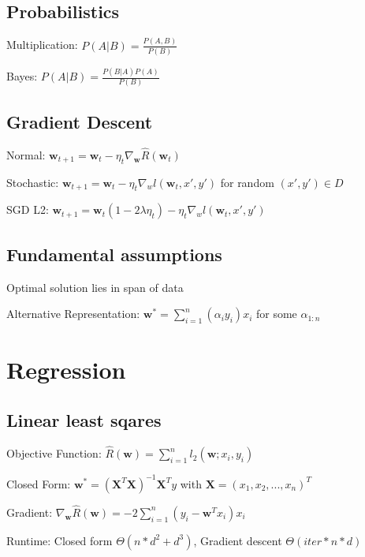 \documentclass[a4paper, 11pt, landscape]{article}
\begin{document}
\begin{multicols*}{3}
\begin{compactdesc}
		\end{compactdesc}
		\subsection{Probabilistics}
		\begin{compactdesc}
			\item[Multiplication:] $P(A|B) = \frac{P(A, B)}{P(B)}$
			\item[Bayes:] $P(A|B) = \frac{P(B|A) P(A)}{P(B)}$
		\end{compactdesc}
		
		
		
		\subsection{Gradient Descent}
		\begin{compactdesc}
			\item[Normal:] $\mathbf{w}_{t+1} = \mathbf{w}_t - \eta_t \nabla_\mathbf{w}\hat{R}(\mathbf{w}_t)$
			\item[Stochastic:] $\mathbf{w}_{t+1} = \mathbf{w}_t - \eta_t \nabla_wl(\mathbf{w}_t, x', y')$ for random $(x', y') \in D$
			\item[SGD L2:] $\mathbf{w}_{t+1} = \mathbf{w}_t(1-2\lambda\eta_t) - \eta_t \nabla_wl(\mathbf{w}_t, x', y')$
		\end{compactdesc}
		
		\subsection{Fundamental assumptions}
		Optimal solution lies in span of data
		\begin{compactdesc}
			\item[Alternative Representation:] $\mathbf{w^*} = \sum_{i=1}^{n}(\alpha_iy_i)x_i$ for some $\alpha_{1:n}$
		\end{compactdesc}

		
		\section{Regression}
		\subsection{Linear least sqares}
		\begin{compactdesc}
			\item[Objective Function:] $\hat{R}(\mathbf{w}) = \sum_{i=1}^{n}l_2(\mathbf{w}; x_i, y_i)$
			\item[Closed Form:] $\mathbf{w^*} = (\mathbf{X}^T\mathbf{X})^{-1}\mathbf{X}^Ty$ with $\mathbf{X} = (x_1, x_2, ..., x_n)^T$
			\item[Gradient:] $\nabla_\mathbf{w} \hat{R}(\mathbf{w}) = -2 \sum_{i=1}^{n}(y_i - \mathbf{w}^Tx_i)x_i$
			\item[Runtime:] Closed form $\varTheta(n*d^2 + d^3)$, Gradient descent $\varTheta(iter * n * d)$
		\end{compactdesc}
		

\end{multicols*}
\end{document}
